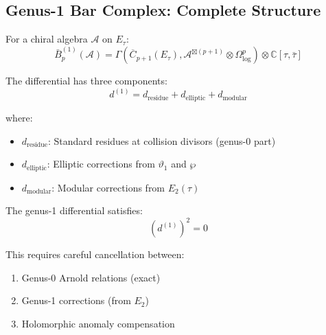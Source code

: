 \subsection{Genus-1 Bar Complex: Complete Structure}

\begin{definition}
\label{def:genus1-bar-complex}
For a chiral algebra $\mathcal{A}$ on $E_\tau$:
\begin{equation}
\bar{B}^{(1)}_p(\mathcal{A}) = \Gamma\left(\overline{C}_{p+1}(E_\tau), 
\mathcal{A}^{\boxtimes (p+1)} \otimes \Omega^p_{\log}\right) \otimes \mathbb{C}[\tau, \bar{\tau}]
\end{equation}

The differential has three components:
\begin{equation}
d^{(1)} = d_{\text{residue}} + d_{\text{elliptic}} + d_{\text{modular}}
\end{equation}

where:
\begin{itemize}
\item $d_{\text{residue}}$: Standard residues at collision divisors (genus-0 part)
\item $d_{\text{elliptic}}$: Elliptic corrections from $\vartheta_1$ and $\wp$
\item $d_{\text{modular}}$: Modular corrections from $E_2(\tau)$
\end{itemize}
\end{definition}

\begin{theorem}
\label{thm:genus1-d-squared}
The genus-1 differential satisfies:
\begin{equation}
(d^{(1)})^2 = 0
\end{equation}

This requires careful cancellation between:
\begin{enumerate}
\item Genus-0 Arnold relations (exact)
\item Genus-1 corrections (from $E_2$)
\item Holomorphic anomaly compensation
\end{enumerate}
\end{theorem}

